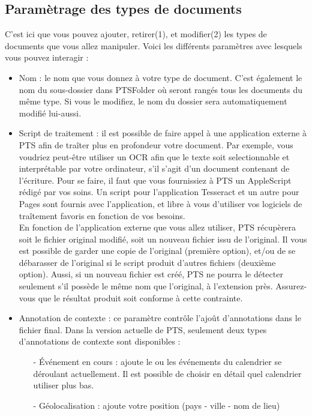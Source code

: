 \documentclass[a4paper,11pt]{article}
\begin{document}
	\subsection{Paramètrage des types de documents}
	C'est ici que vous pouvez ajouter, retirer(1), et modifier(2) les types de documents que vous allez manipuler.
	Voici les différents paramètres avec lesquels vous pouvez interagir :

	\begin{itemize}
		\item Nom : le nom que vous donnez à votre type de document. C'est également le nom du sous-dossier dans PTSFolder où seront rangés tous les documents du même type. Si vous le modifiez, le nom du dossier sera automatiquement modifié lui-aussi.

		\item Script de traitement : il est possible de faire appel à une application externe à PTS afin de traîter plus en profondeur votre document. Par exemple, vous voudriez peut-être utiliser un OCR afin que le texte soit selectionnable et interprétable par votre ordinateur, s'il s'agit d'un document contenant de l'écriture. Pour se faire, il faut que vous fournissiez à PTS un AppleScript rédigé par vos soins. Un script pour l'application Tesseract et un autre pour Pages sont fournis avec l'application, et libre à vous d'utiliser vos logiciels de traîtement favoris en fonction de vos besoins.\\
		En fonction de l'application externe que vous allez utiliser, PTS récupèrera soit le fichier original modifié, soit un nouveau fichier issu de l'original. Il vous est possible de garder une copie de l'original (première option), et/ou de se débarasser de l'original si le script produit d'autres fichiers (deuxième option). Aussi, si un nouveau fichier est créé, PTS ne pourra le détecter seulement s'il possède le même nom que l'original, à l'extension près. Assurez-vous que le résultat produit soit conforme à cette contrainte.

		\item Annotation de contexte : ce paramètre contrôle l'ajoût d'annotations dans le fichier final. Dans la version actuelle de PTS, seulement deux types d'annotations de contexte sont disponibles :
			\begin{itemize}
				\item[-] Événement en cours : ajoute le ou les événements du calendrier se déroulant actuellement. Il est possible de choisir en détail quel calendrier utiliser plus bas.
				\item[-] Géolocalisation : ajoute votre position (pays - ville - nom de lieu)
			\end{itemize}


\end{itemize}
\end{document}
